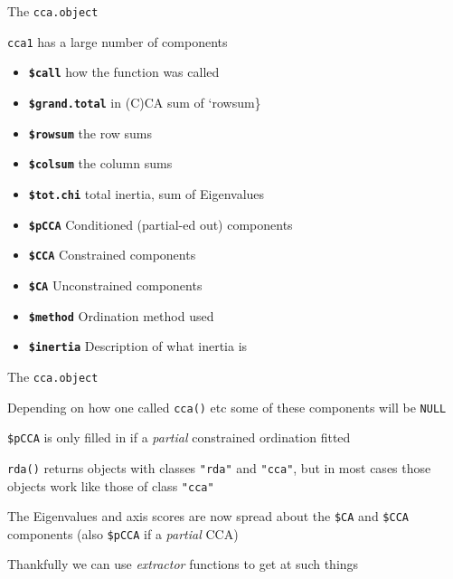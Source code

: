 \documentclass[10pt,ignorenonframetext,compress, aspectratio=169]{beamer}
\providecommand{\tightlist}{%
  \setlength{\itemsep}{0pt}\setlength{\parskip}{0pt}}
\begin{document}
\begin{frame}[fragile]{The \texttt{cca.object}}

\texttt{cca1} has a large number of components

\begin{itemize}
\tightlist
\item
  \textbf{\texttt{\$call}} how the function was called
\item
  \textbf{\texttt{\$grand.total}} in (C)CA sum of `rowsum\}
\item
  \textbf{\texttt{\$rowsum}} the row sums
\item
  \textbf{\texttt{\$colsum}} the column sums
\item
  \textbf{\texttt{\$tot.chi}} total inertia, sum of Eigenvalues
\item
  \textbf{\texttt{\$pCCA}} Conditioned (partial-ed out) components
\item
  \textbf{\texttt{\$CCA}} Constrained components
\item
  \textbf{\texttt{\$CA}} Unconstrained components
\item
  \textbf{\texttt{\$method}} Ordination method used
\item
  \textbf{\texttt{\$inertia}} Description of what inertia is
\end{itemize}

\end{frame}

\begin{frame}[fragile]{The \texttt{cca.object}}

Depending on how one called \texttt{cca()} etc some of these components
will be \texttt{NULL}

\texttt{\$pCCA} is only filled in if a \emph{partial} constrained
ordination fitted

\texttt{rda()} returns objects with classes \texttt{"rda"} and
\texttt{"cca"}, but in most cases those objects work like those of class
\texttt{"cca"}

The Eigenvalues and axis scores are now spread about the \texttt{\$CA}
and \texttt{\$CCA} components (also \texttt{\$pCCA} if a \emph{partial}
CCA)

Thankfully we can use \emph{extractor} functions to get at such things

\end{frame}
\end{document}

